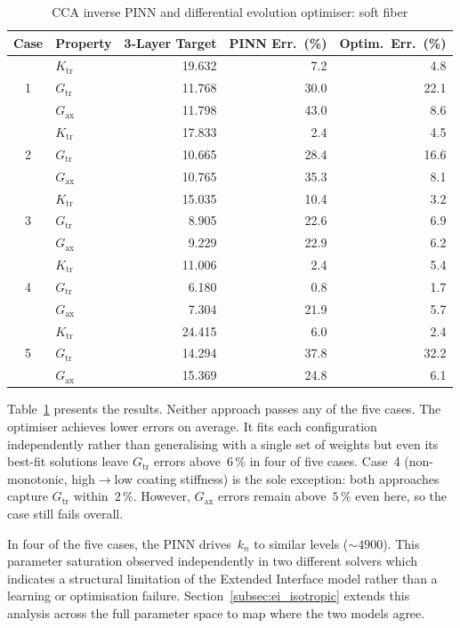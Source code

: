 \documentclass[oneside, 12pt, a4paper, bibliography=totoc]{book}
\begin{document}
\begin{table}[htbp]
\centering
\caption{CCA inverse PINN and differential evolution optimiser: soft fiber}
\label{tab:cca_worked_examples}
{\footnotesize
\begin{tabular}{c l r r r}
\toprule
Case & Property & 3-Layer Target & PINN Err.~(\%) & Optim.\ Err.~(\%) \\
\midrule
\multirow{3}{*}{1}
 & $K_{\text{tr}}$  & 19.632 & 7.2  & 4.8 \\
 & $G_{\text{tr}}$  & 11.768 & 30.0 & 22.1 \\
 & $G_{\text{ax}}$  & 11.798 & 43.0 & 8.6 \\
\midrule
\multirow{3}{*}{2}
 & $K_{\text{tr}}$  & 17.833 & 2.4  & 4.5 \\
 & $G_{\text{tr}}$  & 10.665 & 28.4 & 16.6 \\
 & $G_{\text{ax}}$  & 10.765 & 35.3 & 8.1 \\
\midrule
\multirow{3}{*}{3}
 & $K_{\text{tr}}$  & 15.035 & 10.4 & 3.2 \\
 & $G_{\text{tr}}$  &  8.905 & 22.6 & 6.9 \\
 & $G_{\text{ax}}$  &  9.229 & 22.9 & 6.2 \\
\midrule
\multirow{3}{*}{4}
 & $K_{\text{tr}}$  & 11.006 & 2.4  & 5.4 \\
 & $G_{\text{tr}}$  &  6.180 & 0.8  & 1.7 \\
 & $G_{\text{ax}}$  &  7.304 & 21.9 & 5.7 \\
\midrule
\multirow{3}{*}{5}
 & $K_{\text{tr}}$  & 24.415 & 6.0  & 2.4 \\
 & $G_{\text{tr}}$  & 14.294 & 37.8 & 32.2 \\
 & $G_{\text{ax}}$  & 15.369 & 24.8 & 6.1 \\
\bottomrule
\end{tabular}
}
\end{table}

Table~\ref{tab:cca_worked_examples} presents the results. Neither approach passes any of the five cases. The optimiser achieves lower errors on average. It fits each configuration independently rather than generalising with a single set of weights but even its best-fit solutions leave $G_{\text{tr}}$ errors above~$6\,\%$ in four of five cases. Case~4 (non-monotonic, high$\to$low coating stiffness) is the sole exception: both approaches capture $G_{\text{tr}}$ within~$2\,\%$. However, $G_{\text{ax}}$ errors remain above~$5\,\%$ even here, so the case still fails overall.

In four of the five cases, the PINN drives~$k_n$ to similar levels ($\sim\!4900$). This parameter saturation observed independently in two different solvers which indicates a structural limitation of the Extended Interface model rather than a learning or optimisation failure. Section~\ref{subsec:ei_isotropic} extends this analysis across the full parameter space to map where the two models agree.
\end{document}

